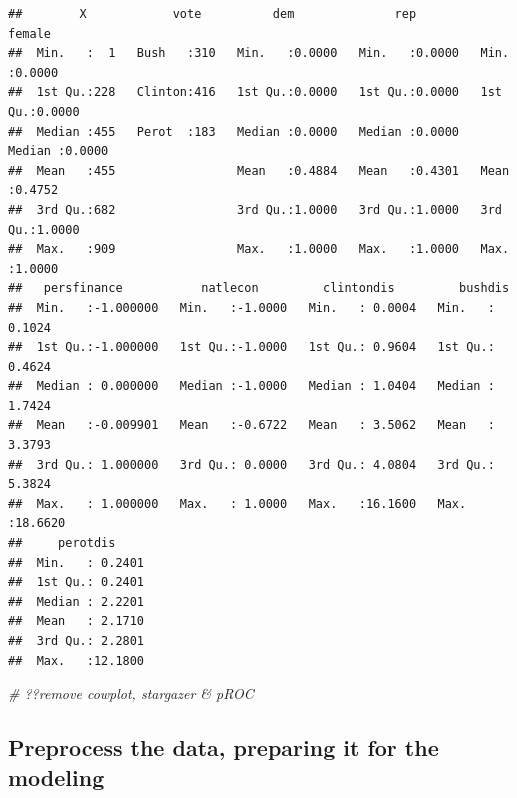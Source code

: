 \documentclass[
]{article}
\newenvironment{Shaded}{\begin{snugshade}}{\end{snugshade}}
\newcommand{\CommentTok}[1]{\textcolor[rgb]{0.56,0.35,0.01}{\textit{#1}}}
\begin{document}
\begin{verbatim}
##        X            vote          dem              rep             female      
##  Min.   :  1   Bush   :310   Min.   :0.0000   Min.   :0.0000   Min.   :0.0000  
##  1st Qu.:228   Clinton:416   1st Qu.:0.0000   1st Qu.:0.0000   1st Qu.:0.0000  
##  Median :455   Perot  :183   Median :0.0000   Median :0.0000   Median :0.0000  
##  Mean   :455                 Mean   :0.4884   Mean   :0.4301   Mean   :0.4752  
##  3rd Qu.:682                 3rd Qu.:1.0000   3rd Qu.:1.0000   3rd Qu.:1.0000  
##  Max.   :909                 Max.   :1.0000   Max.   :1.0000   Max.   :1.0000  
##   persfinance           natlecon         clintondis         bushdis       
##  Min.   :-1.000000   Min.   :-1.0000   Min.   : 0.0004   Min.   : 0.1024  
##  1st Qu.:-1.000000   1st Qu.:-1.0000   1st Qu.: 0.9604   1st Qu.: 0.4624  
##  Median : 0.000000   Median :-1.0000   Median : 1.0404   Median : 1.7424  
##  Mean   :-0.009901   Mean   :-0.6722   Mean   : 3.5062   Mean   : 3.3793  
##  3rd Qu.: 1.000000   3rd Qu.: 0.0000   3rd Qu.: 4.0804   3rd Qu.: 5.3824  
##  Max.   : 1.000000   Max.   : 1.0000   Max.   :16.1600   Max.   :18.6620  
##     perotdis      
##  Min.   : 0.2401  
##  1st Qu.: 0.2401  
##  Median : 2.2201  
##  Mean   : 2.1710  
##  3rd Qu.: 2.2801  
##  Max.   :12.1800
\end{verbatim}

\begin{Shaded}
\begin{Highlighting}[]
\CommentTok{\# ??remove cowplot, stargazer \& pROC}
\end{Highlighting}
\end{Shaded}

\hypertarget{preprocess-the-data-preparing-it-for-the-modeling}{%
\subsection{Preprocess the data, preparing it for the
modeling}\label{preprocess-the-data-preparing-it-for-the-modeling}}
\end{document}
